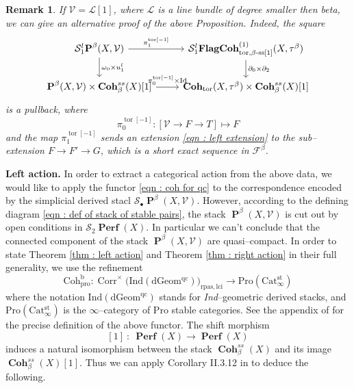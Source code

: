 \documentclass[11pt]{article}
\newtheorem{remark}[theorem]{Remark}
\newcommand{\pro}{\operatorname{Coh^b_{pro}}}
\newcommand{\segal}{\mathcal{S}}
\newcommand{\fbeta}{\mathcal{F}^{\beta}}
\newcommand{\abetatorstack}{\boldsymbol{\operatorname{Coh}}_{\operatorname{tor}}(X,\tau^{\beta})}
\newcommand{\perfstack}{\boldsymbol{\operatorname{Perf}}(X)}
\newcommand{\cohbetassstack}{\boldsymbol{\operatorname{Coh}}^{ss}_{\beta}(X)}
\newcommand{\framing}{\mathcal{V}}
\newcommand{\linebundle}{\mathcal{L}}
\newcommand{\pairs}{\boldsymbol{\operatorname{P}}^{\beta}(X,\mathcal{V})}
\newcommand{\waldhausen}{\mathcal{S}_{\bullet}}
\begin{document}
\begin{remark}
    If $\framing = \linebundle[1]$, where $\linebundle$ is a line bundle of degree smaller then beta, we can give an alternative proof of the above Proposition. Indeed, the square 
    \begin{equation*}\label{eqn : left flatness square}
        \begin{tikzcd}
	{\segal_1^l \pairs} & {\segal_1^l\boldsymbol{\operatorname{FlagCoh}}^{\operatorname{(1)}}_{\operatorname{tor, \beta-ss[1]}}}(X,\tau^\beta) \\
	\pairs \times \cohbetassstack[1] & \abetatorstack \times \cohbetassstack[1]
	\arrow[from=1-1, to=1-2 , "\pi_1^{\operatorname{tor}[-1]}"]
	\arrow[from=1-1, to=2-1, "\omega_0 \times u^l_1"]
	\arrow[from=1-2, to=2-2, "\partial_0 \times \partial_2"]
	\arrow[{name=0, anchor=center, inner sep=0}, from=2-1, to=2-2, "\pi_0^{\operatorname{tor}[-1]} \times \operatorname{Id}"]
    \end{tikzcd}
    \end{equation*}
    is a pullback, where 
    \[
        \pi_0^{\operatorname{tor}[-1]} \colon [\framing \rightarrow F \rightarrow T] \longmapsto F
    \]
    and the map $ \pi_1^{\operatorname{tor}[-1]}$ sends an extension \eqref{eqn : left extension} to the sub--extension $F\rightarrow F'\rightarrow G$, which is a short exact sequence in $\fbeta$.
\end{remark}

\noindent\textbf{Left action. }In order to extract a categorical action from the above data, we would like to apply the functor \eqref{eqn : coh for qc} to the correspondence encoded by the simplicial derived stacl $\waldhausen\pairs$. However, according to the defining diagram \eqref{eqn : def of stack of stable pairs}, the stack $\pairs$ is cut out by open conditions in $\segal_2\perfstack$. In particular we can't conclude that the connected component of the stack $\pairs$ are quasi--compact. In order to state Theorem \ref{thm : left action} and Theorem \ref{thm : right action} in their full generality, we use the refinement
\[
    \pro \colon \operatorname{Corr}^\times(\operatorname{Ind(dGeom^{qc}))_{rpas,lci}} \longrightarrow \operatorname{Pro(Cat^{st}_{\infty})}
\]
where the notation $\operatorname{Ind(dGeom^{qc})}$ stands for \textit{Ind}--geometric derived stacks, and $\operatorname{Pro(Cat^{st}_{\infty})}$ is the $\infty$--category of Pro stable categories. See the appendix of \cite{Porta2019TwodimensionalCH} for the precise definition of the above functor. The shift morphism 
        \[
            [1] \ \colon \ \perfstack \longrightarrow \perfstack
        \]
        induces a natural isomorphism between the stack $\cohbetassstack$ and its image $\cohbetassstack[1]$. Thus we can apply Corollary II.3.12 in \cite{dps} to deduce the following.
\end{document}
